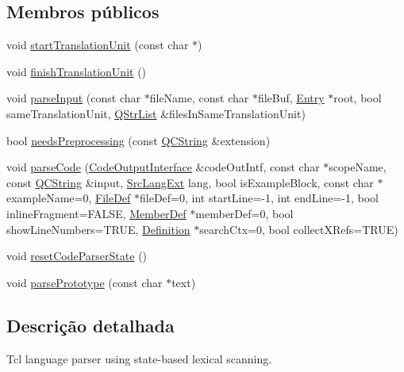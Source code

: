 \subsection*{Membros públicos}
\begin{DoxyCompactItemize}
\item 
void \hyperlink{class_tcl_language_scanner_a9179d0b9461d5d683468fb6015d1643f}{start\-Translation\-Unit} (const char $\ast$)
\item 
void \hyperlink{class_tcl_language_scanner_a245c1fbfb8ba359e61d832c4e7c6c98e}{finish\-Translation\-Unit} ()
\item 
void \hyperlink{class_tcl_language_scanner_ab1ed2c75b61719cec6060b9f69419743}{parse\-Input} (const char $\ast$file\-Name, const char $\ast$file\-Buf, \hyperlink{class_entry}{Entry} $\ast$root, bool same\-Translation\-Unit, \hyperlink{class_q_str_list}{Q\-Str\-List} \&files\-In\-Same\-Translation\-Unit)
\item 
bool \hyperlink{class_tcl_language_scanner_ac49a959c40c82385233e4c75163e39ae}{needs\-Preprocessing} (const \hyperlink{class_q_c_string}{Q\-C\-String} \&extension)
\item 
void \hyperlink{class_tcl_language_scanner_ac614074ea2c569cabd265a6168ad36d2}{parse\-Code} (\hyperlink{class_code_output_interface}{Code\-Output\-Interface} \&code\-Out\-Intf, const char $\ast$scope\-Name, const \hyperlink{class_q_c_string}{Q\-C\-String} \&input, \hyperlink{types_8h_a9974623ce72fc23df5d64426b9178bf2}{Src\-Lang\-Ext} lang, bool is\-Example\-Block, const char $\ast$example\-Name=0, \hyperlink{class_file_def}{File\-Def} $\ast$file\-Def=0, int start\-Line=-\/1, int end\-Line=-\/1, bool inline\-Fragment=F\-A\-L\-S\-E, \hyperlink{class_member_def}{Member\-Def} $\ast$member\-Def=0, bool show\-Line\-Numbers=T\-R\-U\-E, \hyperlink{class_definition}{Definition} $\ast$search\-Ctx=0, bool collect\-X\-Refs=T\-R\-U\-E)
\item 
void \hyperlink{class_tcl_language_scanner_a5d8e0ded4118b6eff98aa23eb64db02c}{reset\-Code\-Parser\-State} ()
\item 
void \hyperlink{class_tcl_language_scanner_a022344e4fa95056a941a9e8c02334872}{parse\-Prototype} (const char $\ast$text)
\end{DoxyCompactItemize}


\subsection{Descrição detalhada}
Tcl language parser using state-\/based lexical scanning. 

